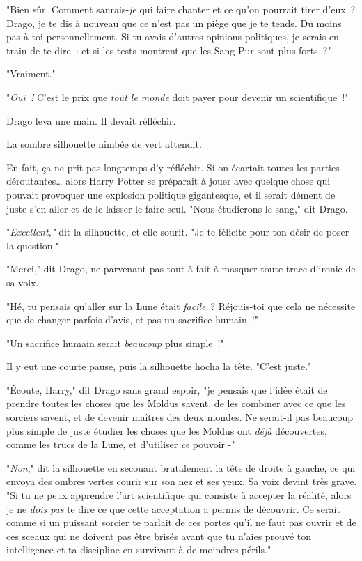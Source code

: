 "Bien sûr. Comment saurais-\emph{je} qui faire chanter et ce qu'on pourrait tirer d'eux~? Drago, je te dis à nouveau que ce n'est pas un piège que je te tends. Du moins pas à toi personnellement. Si tu avais d'autres opinions politiques, je serais en train de te dire~: et si les tests montrent que les Sang-Pur sont plus forts~?"

"Vraiment."

"\emph{Oui~!} C'est le prix que \emph{tout le monde} doit payer pour devenir un scientifique~!"

Drago leva une main. Il devait réfléchir.

La sombre silhouette nimbée de vert attendit.

En fait, ça ne prit pas longtemps d'y réfléchir. Si on écartait toutes les parties déroutantes… alors Harry Potter se préparait à jouer avec quelque chose qui pouvait provoquer une explosion politique gigantesque, et il serait dément de juste s'en aller et de le laisser le faire seul. "Nous étudierons le sang," dit Drago.

"\emph{Excellent,"} dit la silhouette, et elle sourit. "Je te félicite pour ton désir de poser la question."

"Merci," dit Drago, ne parvenant pas tout à fait à masquer toute trace d'ironie de sa voix.

"Hé, tu pensais qu'aller sur la Lune était \emph{facile}~? Réjouis-toi que cela ne nécessite que de changer parfois d'avis, et pas un sacrifice humain~!"

"Un sacrifice humain serait \emph{beaucoup} plus simple~!"

Il y eut une courte pause, puis la silhouette hocha la tête. "C'est juste."

"Écoute, Harry," dit Drago sans grand espoir, "je pensais que l'idée était de prendre toutes les choses que les Moldus savent, de les combiner avec ce que les sorciers savent, et de devenir maîtres des deux mondes. Ne serait-il pas beaucoup plus simple de juste étudier les choses que les Moldus ont \emph{déjà} découvertes, comme les trucs de la Lune, et d'utiliser \emph{ce} pouvoir -"

"\emph{Non}," dit la silhouette en secouant brutalement la tête de droite à gauche, ce qui envoya des ombres vertes courir sur son nez et ses yeux. Sa voix devint très grave. "Si tu ne peux apprendre l'art scientifique qui consiste à accepter la réalité, alors je ne \emph{dois pas} te dire ce que cette acceptation a permis de découvrir. Ce serait comme si un puissant sorcier te parlait de ces portes qu'il ne faut pas ouvrir et de ces sceaux qui ne doivent pas être brisés avant que tu n'aies prouvé ton intelligence et ta discipline en survivant à de moindres périls."


